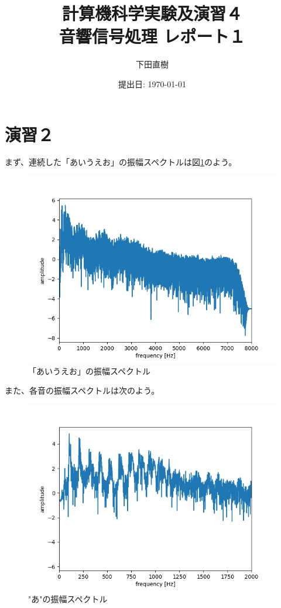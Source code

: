 \documentclass[a4paper,11pt]{jsarticle}
\begin{document}
\title{
  計算機科学実験及演習４	\\   %
  \large{音響信号処理 レポート１}	%
}
\author{下田直樹}
\date{提出日: \today}
\maketitle

\tableofcontents
\clearpage

\section{演習２}
まず、連続した「あいうえお」の振幅スペクトルは図\ref{}のよう。
\begin{figure}[H]
  \centering
  \includegraphics[scale=0.5]{../ex02/img/plot-spectrum-whole_all.png}
  \caption{「あいうえお」の振幅スペクトル}
  \label{spectrum_all}
\end{figure}

また、各音の振幅スペクトルは次のよう。
\begin{figure}[H]
  \centering
  \includegraphics[scale=0.5]{../ex02/img/plot-spectrum-2000_a.png}
  \caption{"あ"の振幅スペクトル}
  \label{spectrum_a}
\end{figure}
\end{document}
